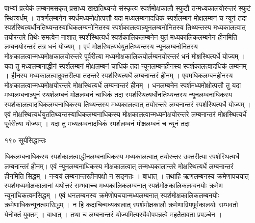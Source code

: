 \documentclass[11pt, openany]{book}
\begin{document}
\begin{sloppypar}
\noindent पाभ्यां प्रत्येकं लम्बनमसकृत् प्रसाध्य खखतिथ्यन्ते संस्कृत्य स्पर्शमोक्षकालौ स्फुटौ तन्मध्यकालयोरन्तरं स्फुटं स्थित्यर्धम् । तत्रर्णलम्बनेन स्पर्धमध्यमोक्षोत्पत्तौ यदा मध्यलम्बनादधिकं स्पर्शलम्बनं मोक्षलम्बनं च न्यूनं तदा स्पर्शस्थित्यर्धोनतिथ्यन्तस्याधिकलम्बनोनितस्य स्पर्शकालत्वान्न्यूनलम्बनोनितस्य तिथ्यन्तस्य मध्यकालत्वात् तयोरन्तरे तिथेः समत्वेन नाशात् स्पर्शस्थित्यर्धं स्पर्शकालिकलम्बनेन युतं मध्यकालिकलम्बनेन हीनमिति लम्बनयोरन्तरं तत्र धनं योज्यम् । एवं मोक्षस्थित्यर्धयुततिथ्यन्तस्य न्यूनलम्बनोनितस्य मोक्षकालत्वान्मध्यमोक्षकालयोरन्तरे पूर्वरीत्या मध्यमोक्षकालिकयोर्लम्बनयोरन्तरं धनं मोक्षस्थित्यर्धे योज्यम् । यदा तु मध्यलम्बनाद्धीनं स्पर्शलम्बनं मोक्षलम्बनं चाधिकं तदा न्यूनलम्बनहीनस्य स्पर्शकालत्वादधिकं लम्बनम् । हीनस्य मध्यकालत्वादुक्तरीत्या तदन्तरे स्पर्शस्थित्यर्धे लम्बनान्तरं हीनम् । एवमधिकलम्बनहीनस्य मोक्षकालत्वान्मध्यमोक्षयोरन्तरे मोक्षस्थित्यर्धे लम्बनान्तरं हीनम् । धनलम्बनेन स्पर्शमध्यमोक्षोत्पत्तौ तु यदा मध्यलम्बनान्न्यूनं स्थर्शलम्बनं मोक्षलम्बनं चाधिकं तदा स्पर्शस्थित्यर्धोनतिथ्यन्तस्य न्यूनलम्बनाधिकस्य स्पर्शकालत्वादधिकलम्बनाधिकस्य तिथ्यन्तस्य मध्यकालत्वात् तयोरन्तरे लम्बनान्तरं स्पर्शस्थित्यर्धे योज्यम् । एवं मोक्षस्थित्यर्धयुततिथ्यन्तस्याधिकलम्बनाधिकस्य मोक्षकालत्वान्मध्यमोक्षयोरन्तरे लम्बनान्तरं मोक्षस्थित्यर्धे पूर्वरीत्या योज्यम् । यदा तु मध्यलम्बनादधिकं स्पर्शलम्बनं मोक्षलम्बनं च न्यूनं तदा\textendash
\end{sloppypar}


\newpage


 \noindent १९० \hspace{4cm} सूर्यसिद्धान्तः
\vspace{1cm}

\begin{sloppypar}
\noindent धिकलम्बनाधिकस्य स्पर्शकालत्वाद्धीनलम्बनाधिकस्य मध्यकालत्वात् तयोरन्तर उक्तरीत्या स्पर्शस्थित्यर्धे लम्बनान्तरं हीनम्। एवं न्यूनलम्बनाधिकस्य मोक्षकालत्वात् तन्मध्यकालान्तरे मोक्षस्थित्यर्धे लम्बनान्तरं हीनमिति सिद्धम् । नन्वयं लम्बनान्तरहीनपक्षो न सङ्गतः । बाधात् । तथाहि ऋणलम्बनस्य क्रमेणापचयात् स्पर्शमध्यमोक्षकालानां यथोत्तरं सम्भवाच्च मध्यकालिकलम्बनात् स्पर्शमोक्षकालिकलम्बनयोः क्रमेण न्यूनाधिकत्वमसिद्धम् । एवं धनलम्बनस्य क्रमेणोपचयान्मध्यलम्बनात् स्पर्शमोक्षकालिकलम्बनयोः क्रमेणाधिकन्यूनत्वमसिद्धम् । न हि कदाचिन्मध्यकालात् स्पर्शमोक्षकालौ क्रमेणाग्रिमपूर्वकालयोः सम्भवतो येनोक्तं युक्तम् । बाधात् । तथा च लम्बनान्तरं योज्यमित्यस्यैवोपपन्नत्वे महतैतावता प्रपञ्चेन ।
\end{sloppypar}
\end{document}
